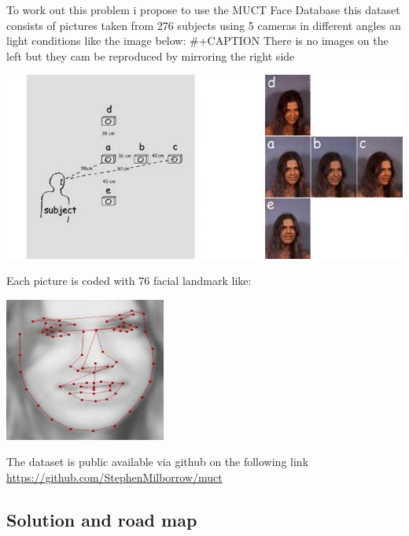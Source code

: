 \documentclass[11pt]{article}
\begin{document}
To work out this problem i propose to use the MUCT Face Database
\cite{Milborrow10}  this dataset consists of pictures taken from 276 subjects
using 5 cameras in different angles an light conditions like the image below: 
\#+CAPTION There is no images on the left but they cam be reproduced by mirroring the right side
\begin{center}
\includegraphics[width=.9\linewidth]{./images/muct-views-lores.jpg}
\end{center}

Each picture is coded with 76 facial landmark like: 
\begin{center}
\includegraphics[width=.9\linewidth]{./images/landmarks.jpg}
\end{center}


The dataset is public available via github on the following link
\url{https://github.com/StephenMilborrow/muct}

\subsection{Solution and road map}
\label{sec:orgb19ef59}
\end{document}
